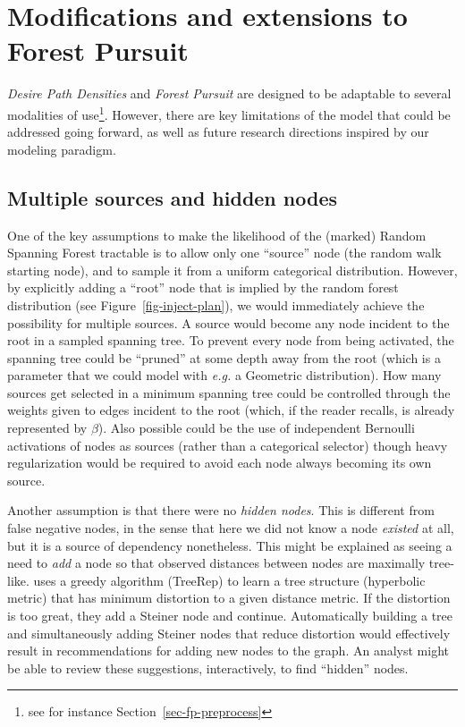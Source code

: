 \documentclass[%
	12pt,
		oneside,
		letterpaper
]{book}
\begin{document}
\section{Modifications and extensions to Forest Pursuit}\label{sec-future-fp}

\emph{Desire Path Densities} and \emph{Forest Pursuit} are designed to be adaptable to several modalities of use\footnote{see for instance Section~\ref{sec-fp-preprocess}}.
However, there are key limitations of the model that could be addressed going forward, as well as future research directions inspired by our modeling paradigm.

\subsection{Multiple sources and hidden nodes}\label{multiple-sources-and-hidden-nodes}

One of the key assumptions to make the likelihood of the (marked) Random Spanning Forest tractable is to allow only one ``source'' node (the random walk starting node), and to sample it from a uniform categorical distribution.
However, by explicitly adding a ``root'' node that is implied by the random forest distribution (see Figure~\ref{fig-inject-plan}), we would immediately achieve the possibility for multiple sources.
A source would become any node incident to the root in a sampled spanning tree.
To prevent every node from being activated, the spanning tree could be ``pruned'' at some depth away from the root (which is a parameter that we could model with \emph{e.g.} a Geometric distribution).
How many sources get selected in a minimum spanning tree could be controlled through the weights given to edges incident to the root (which, if the reader recalls, is already represented by \(\beta\)).
Also possible could be the use of independent Bernoulli activations of nodes as sources (rather than a categorical selector) though heavy regularization would be required to avoid each node always becoming its own source.

Another assumption is that there were no \emph{hidden nodes}.
This is different from false negative nodes, in the sense that here we did not know a node \emph{existed} at all, but it is a source of dependency nonetheless.
This might be explained as seeing a need to \emph{add} a node so that observed distances between nodes are maximally tree-like.
\autocite{TreeIam_Sonthalia2020} uses a greedy algorithm (TreeRep) to learn a tree structure (hyperbolic metric) that has minimum distortion to a given distance metric.
If the distortion is too great, they add a Steiner node and continue.
Automatically building a tree and simultaneously adding Steiner nodes that reduce distortion would effectively result in recommendations for adding new nodes to the graph.
An analyst might be able to review these suggestions, interactively, to find ``hidden'' nodes.
\end{document}
